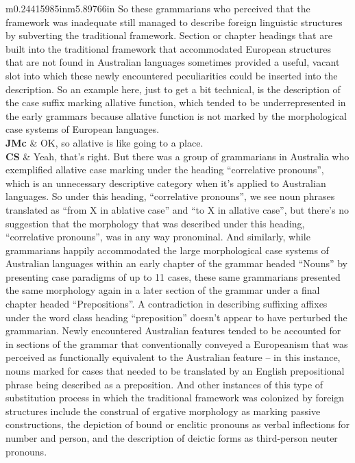 \documentclass[12pt]{article}
\begin{document}
\begin{flushleft}
\begin{supertabular}{m{0.24415985in}m{5.89766in}}
So these grammarians who perceived that the framework was inadequate still managed to describe foreign linguistic structures by subverting the traditional framework. Section or chapter headings that are built into the traditional framework that accommodated European structures that are not found in Australian languages sometimes provided a useful, vacant slot into which these newly encountered peculiarities could be inserted into the description. So an example here, just to get a bit technical, is the description of the case suffix marking allative function, which tended to be underrepresented in the early grammars because allative function is not marked by the morphological case systems of European languages.\\
\textbf{JMc}\newline
 &
OK, so allative is like going to a place.\\
\textbf{CS}\newline
 &
Yeah, that’s right. But there was a group of grammarians in Australia who exemplified allative case marking under the heading “correlative pronouns”, which is an unnecessary descriptive category when it’s applied to Australian languages. So under this heading, “correlative pronouns”, we see noun phrases translated as “from X in ablative case” and “to X in allative case”, but there’s no suggestion that the morphology that was described under this heading, “correlative pronouns”, was in any way pronominal. And similarly, while grammarians happily accommodated the large morphological case systems of Australian languages within an early chapter of the grammar headed “Nouns” by presenting case paradigms of up to 11 cases, these same grammarians presented the same morphology again in a later section of the grammar under a final chapter headed “Prepositions”. A contradiction in describing suffixing affixes under the word class heading “preposition” doesn’t appear to have perturbed the grammarian. Newly encountered Australian features tended to be accounted for in sections of the grammar that conventionally conveyed a Europeanism that was perceived as functionally equivalent to the Australian feature – in this instance, nouns marked for cases that needed to be translated by an English prepositional phrase being described as a preposition. And other instances of this type of substitution process in which the traditional framework was colonized by foreign structures include the construal of ergative morphology as marking passive constructions, the depiction of bound or enclitic pronouns as verbal inflections for number and person, and the description of deictic forms as third-person neuter pronouns.\\

\end{supertabular}
\end{flushleft}
\end{document}
